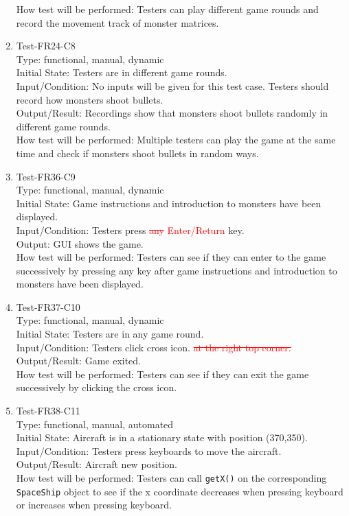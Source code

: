\documentclass[12pt]{article}
\begin{document}
\begin{enumerate}[1.]
How test will be performed: Testers can play different
game rounds and record the movement track of monster 
matrices.
\item Test-FR24-C8\\
Type: functional, manual, dynamic\\
Initial State: Testers are in different game rounds.\\
Input/Condition: No inputs will be given for this test 
case. Testers should record how monsters shoot bullets.\\
Output/Result: Recordings show that monsters shoot
bullets randomly in different game rounds.\\
How test will be performed: Multiple testers can play
 the game at the same time and check if monsters shoot
  bullets in random ways.
\item Test-FR36-C9\\
Type: functional, manual, dynamic\\
Initial State:  Game instructions and introduction to 
monsters have been displayed.\\
Input/Condition: Testers press \textcolor{red}{\st{any} Enter/Return} key.\\
Output: GUI shows the game.\\
How test will be performed: Testers can see if they can enter to the game successively by pressing any key
after game instructions and introduction to 
monsters have been displayed.
\item Test-FR37-C10\\
Type: functional, manual, dynamic\\
Initial State: Testers are in any game round.\\
Input/Condition: Testers click cross icon. \textcolor{red}{\st{at the right
top corner.}}\\
Output/Result: Game exited.\\
How test will be performed: Testers can see if they can exit the game successively by clicking the cross icon.
\item Test-FR38-C11\\
Type: functional, manual, automated\\
Initial State:  Aircraft is in a stationary state with position (370,350).\\
Input/Condition: Testers press keyboards to move the aircraft.\\
Output/Result: Aircraft new position.\\
How test will be performed: Testers can call \verb|getX()| on the corresponding \verb|SpaceShip| object to see if the x coordinate decreases when pressing keyboard or increases when pressing keyboard.


\end{enumerate}
\end{document}
